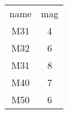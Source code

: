 \begin{table}
\begin{tabular}{cc}
name & mag \\
M31 & 4 \\
M32 & 6 \\
M31 & 8 \\
M40 & 7 \\
M50 & 6 \\
\end{tabular}
\end{table}
